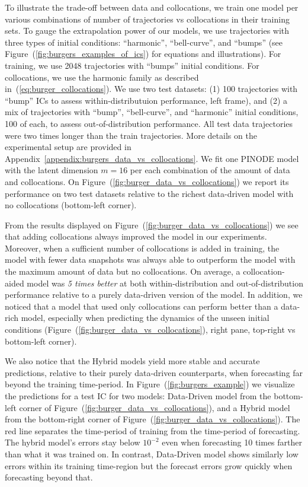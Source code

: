 To illustrate the trade-off between data and collocations, we train one model per various combinations of number of trajectories vs collocations in their training sets. To gauge the extrapolation power of our models, we use trajectories with three types of initial conditions: ``harmonic'', ``bell-curve'', and ``bumps'' (see Figure~(\ref{fig:burgers_examples_of_ics}) for equations and illustrations). For training, we use 2048 trajectories with ``bumps'' initial conditions. For collocations, we use the harmonic family as described in~(\ref{eq:burger_collocations}). We use two test datasets: (1) 100 trajectories with ``bump'' ICs to assess within-distributuion performance, left frame), and (2) a mix of trajectories with ``bump'', ``bell-curve'', and ``harmonic'' initial conditions, 100 of each, to assess out-of-distribution performance. All test data trajectories were two times longer than the train trajectories. More details on the experimental setup are provided in Appendix~\ref{appendix:burgers_data_vs_collocations}. We fit one PINODE model with the latent dimension $m = 16$ per each combination of the amount of data and collocations. On Figure~(\ref{fig:burger_data_vs_collocations}) we report its performance on two test datasets relative to the richest data-driven model with no collocations (bottom-left corner). 

From the results displayed on Figure~(\ref{fig:burger_data_vs_collocations}) we see that adding collocations always improved the model in our experiments.  Moreover, when a sufficient number of collocations is added in training, the model with fewer data snapshots was always able to outperform the model with the maximum amount of data but no collocations. On average, a collocation-aided model was \textit{5 times better} at both within-distribution and out-of-distribution performance relative to a purely data-driven version of the model. In addition, we noticed that a model that used only collocations can perform better than a data-rich model, especially when predicting the dynamics of the unseen initial conditions (Figure~(\ref{fig:burger_data_vs_collocations}), right pane, top-right vs bottom-left corner). 

We also notice that the Hybrid models yield more stable and accurate predictions, relative to their purely data-driven counterparts, when forecasting far beyond the training time-period. In Figure~(\ref{fig:burgers_example}) we visualize the predictions for a test IC for two models: Data-Driven model from the bottom-left corner of Figure~(\ref{fig:burger_data_vs_collocations}), and a Hybrid model from the bottom-right corner of Figure~(\ref{fig:burger_data_vs_collocations}). The red line separates the time-period of training from the time-period of forecasting. The hybrid model's errors stay below $10^{-2}$ even when forecasting 10 times farther than what it was trained on. In contrast, Data-Driven model shows similarly low errors within its training time-region but the forecast errors grow quickly when forecasting beyond that.

